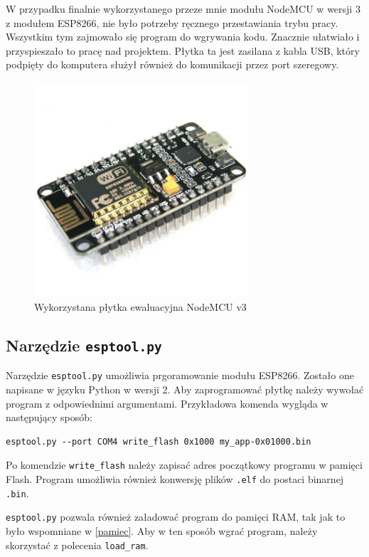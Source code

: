 W przypadku finalnie wykorzystanego przeze mnie modułu NodeMCU w wersji 3 z modułem
ESP8266, nie było potrzeby ręcznego przestawiania trybu pracy. Wszystkim tym zajmowało
się program do wgrywania kodu. Znacznie ułatwiało i przyspieszało to pracę nad projektem.
Płytka ta jest zasilana z kabla USB, który podpięty do komputera służył również do komunikacji
przez port szeregowy.

\begin{figure}[H]
	\centering
    \includegraphics[width=8cm]{./images/nodemcu.jpg}
    \caption{Wykorzystana płytka ewaluacyjna NodeMCU v3}
	\label{esp8266-nodemcu}
\end{figure}
\FloatBarrier

\subsection{Narzędzie \texttt{esptool.py}}
\label{esptool}
Narzędzie \texttt{esptool.py} umożliwia prgoramowanie modułu ESP8266. Zostało one 
napisane w języku Python w wersji 2. Aby zaprogramować płytkę należy wywołać 
program z odpowiednimi argumentami. Przykładowa komenda wygląda w następujący sposób:

\begin{lstlisting}[style=customc,
    frame=single,
    caption={Przykładowa komenda programująca moduł ESP8266},
    captionpos=b,
    label={esptool_basic}]
esptool.py --port COM4 write_flash 0x1000 my_app-0x01000.bin
\end{lstlisting}

Po komendzie \texttt{write\_{}flash} należy zapisać adres początkowy programu w 
pamięci Flash. Program umożliwia również konwersję plików \texttt{.elf} do postaci 
binarnej \texttt{.bin}. 

\texttt{esptool.py} pozwala również załadować program do pamięci RAM, tak jak to było
wspomniane w \ref{pamiec}. Aby w ten sposób wgrać program, należy skorzystać z polecenia 
\texttt{load\_{}ram}.


